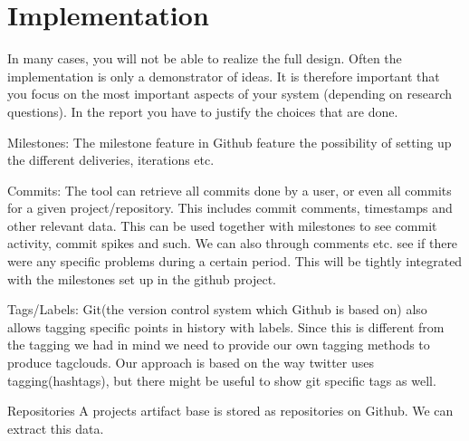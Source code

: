 \chapter{Implementation}
In many cases, you will not be able to realize the full design. Often the implementation is only a demonstrator of ideas. 
It is therefore important that you focus on the most important aspects of your system (depending on research questions). 
In the report you have to justify the choices that are done.

Milestones:
The milestone feature in Github feature the possibility of setting up the different deliveries, iterations etc.

Commits:
The tool can retrieve all commits done by a user, or even all commits for a given project/repository. This includes commit comments, timestamps and other relevant data. This can be used together with milestones to see commit activity, commit spikes and such. We can also through comments etc. see if there were any specific problems during a certain period. This will be tightly integrated with the milestones set up in the github project. 

Tags/Labels:
Git(the version control system which Github is based on) also allows tagging specific points in history with labels. Since this is different from the tagging we had in mind we need to provide our own tagging methods to produce tagclouds. Our approach is based on the way twitter uses tagging(hashtags), but there might be useful to show git specific tags as well.

Repositories
A projects artifact base is stored as repositories on Github. We can extract this data. 

